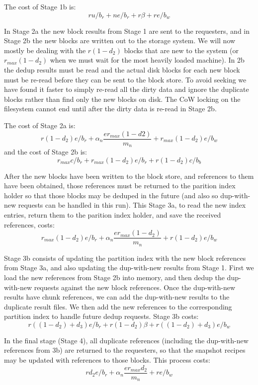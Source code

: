 The cost of Stage 1b is:
\[
    r u / b_r + n e / b_r + r \beta + r e / b_w
\]

In Stage 2a the new block results from Stage 1 are sent to the requesters, and
in Stage 2b the new blocks are written out to the storage system. We will now
mostly be dealing with the $r(1-d_2)$ blocks that are new to the system (or
$r_{max}(1-d_2)$ when we must wait for the most heavily loaded machine). In 2b
the dedup results must be read and the actual disk blocks for each new block
must be re-read before they can be sent to the block store. To avoid seeking
we have found it faster to simply re-read all the dirty data and ignore the
duplicate blocks rather than find only the new blocks on disk. The CoW locking
on the filesystem cannot end until after the dirty data is re-read in Stage 2b.

The cost of Stage 2a is:
\[
    r(1-d_2)e / b_r + \alpha_n\frac{e r_{max}(1-d2)}{m_n} + r_{max}(1-d_2)e / b_w
\]
and the cost of Stage 2b is:
\[
    r_{max}c / b_r + r_{max}(1-d_2)e / b_r + r(1-d_2)c / b_b
\]

After the new blocks have been written to the block store, and references to
them have been obtained, those references must be returned to the parition
index holder so that those blocks may be deduped in the future (and also so
dup-with-new requests can be handled in this run). This Stage 3a, to read the
new index entries, return them to the parition index holder, and save the
received references, costs:
\[
    r_{max} (1-d_2)e / b_r + \alpha_n\frac{e r_{max}(1-d_2)}{m_n} + r(1-d_2)e / b_w
\]

Stage 3b consists of updating the partition index with the new block references
from Stage 3a, and also updating the dup-with-new results from Stage 1. First
we load the new references from Stage 2b into memory, and then dedup the
dup-with-new requests against the new block references. Once the dup-with-new
results have chunk references, we can add the dup-with-new results to the
duplicate result files. We then add the new references to the corresponding
partition index to handle future dedup requests. Stage 3b costs:
\[
    r ((1-d_2) + d_3)e/b_r + r (1-d_2)\beta + r((1-d_2) + d_3)e / b_w
\]

In the final stage (Stage 4), all duplicate references (including the
dup-with-new references from 3b) are returned to the requesters, so that the
snapshot recipes may be updated with references to those blocks. This process
costs:
\[
    r d_2 e / b_r + \alpha_n\frac{e r_{max} d_2}{m_n} + r e / b_w
\]

